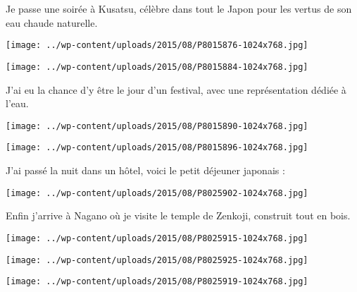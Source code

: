 \pagebreak
 Je passe une soirée à Kusatsu, célèbre dans tout le Japon pour les vertus de son eau chaude naturelle. 
\begin{center} \texttt{[image: ../wp-content/uploads/2015/08/P8015876-1024x768.jpg]} \end{center}
\begin{center} \texttt{[image: ../wp-content/uploads/2015/08/P8015884-1024x768.jpg]} \end{center}

\pagebreak
 J'ai eu la chance d'y être le jour d'un festival, avec une représentation dédiée à l'eau.  
\begin{center} \texttt{[image: ../wp-content/uploads/2015/08/P8015890-1024x768.jpg]} \end{center}
\begin{center} \texttt{[image: ../wp-content/uploads/2015/08/P8015896-1024x768.jpg]} \end{center}

\pagebreak
 J'ai passé la nuit dans un hôtel, voici le petit déjeuner japonais : 
\begin{center} \texttt{[image: ../wp-content/uploads/2015/08/P8025902-1024x768.jpg]} \end{center}

 Enfin j'arrive à Nagano où je visite le temple de Zenkoji, construit tout en bois. 
\begin{center} \texttt{[image: ../wp-content/uploads/2015/08/P8025915-1024x768.jpg]} \end{center}
\begin{center} \texttt{[image: ../wp-content/uploads/2015/08/P8025925-1024x768.jpg]} \end{center}
\begin{center} \texttt{[image: ../wp-content/uploads/2015/08/P8025919-1024x768.jpg]} \end{center}
